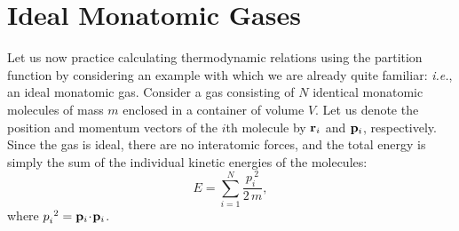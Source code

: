 \section{Ideal Monatomic Gases}\label{s7.8}
Let us now practice calculating thermodynamic relations using the partition
function by considering an example with which we are already quite familiar:
{\em i.e.}, 
an ideal monatomic gas. Consider a gas consisting of $N$ identical monatomic
molecules of mass $m$ enclosed in a container of volume $V$.
Let us  denote the position and momentum 
vectors of the $i$th molecule by ${\bf r}_i$ and 
${\bf p}_i$, respectively.
 Since the gas is ideal, there are no interatomic forces, and the
total  energy
 is simply the sum of the individual kinetic energies of the molecules:
\begin{equation}
E = \sum_{i=1}^N \frac{ p_i^{~2}}{2\,m},\label{e7.67}
\end{equation}
where $p_i^{~2} = {\bf p}_i\!\cdot \!{\bf p}_i$. 

